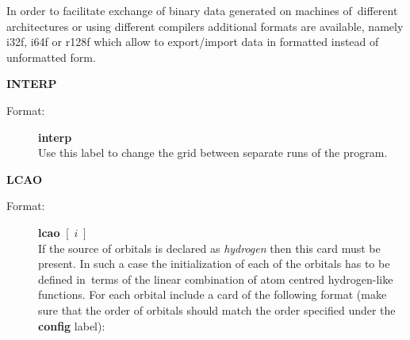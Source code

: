 \documentclass[12pt,a4paper]{article}
\begin{document}
\begin{description}
\begin{description}
  In order to facilitate exchange of binary data generated on machines of~different
  architectures or using different compilers additional formats are available, namely
  i32f, i64f or r128f which allow to export/import data in formatted instead of
  unformatted form.
\end{description}


\item \textbf{INTERP}
\begin{description}
\item[Format:] \textbf{interp} \\ Use this label to change the grid
  between separate runs of the program.
\end{description}




\item \textbf{LCAO}
\begin{description}
\item[Format:] \textbf{lcao} $[\;i\;]$\\ If the source of orbitals is declared as
  \textsl{hydrogen} then this card must be present. In such a case the initialization of
  each of the orbitals has to be defined in~terms of the linear combination of atom
  centred hydrogen-like functions. For each orbital include a card of the following format
  (make sure that the order of orbitals should match the order specified under the
  \textbf{config} label):


\end{description}
\end{description}
\end{document}
